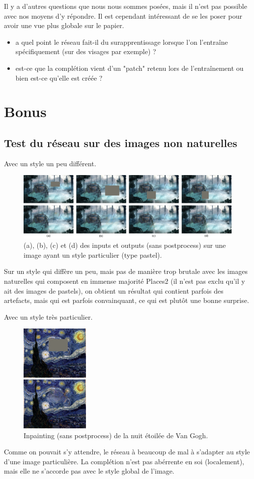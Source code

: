 \documentclass[12pt]{article}
\begin{document}
Il y a d'autres questions que nous nous sommes posées, mais il n'est pas possible avec nos moyens d'y répondre. Il est cependant intéressant de se les poser pour avoir une vue plus globale sur le papier.
\begin{itemize}
    \item a quel point le réseau fait-il du surapprentissage lorsque l'on l'entraîne spécifiquement (sur des visages par exemple) ?
    \item est-ce que la complétion vient d'un "patch" retenu lors de l'entraînement ou bien est-ce qu'elle est créée ?
\end{itemize}

\section{Bonus}

\subsection{Test du réseau sur des images non naturelles}

Avec un style un peu différent.

\begin{figure}[H]
    \includegraphics[width=1.0\textwidth]{Col.png}
    \caption{(a), (b), (c) et (d) des inputs et outputs (sans postprocess) sur une image ayant un style particulier (type pastel).}
\end{figure}

Sur un style qui diffère un peu, mais pas de manière trop brutale avec les images naturelles qui composent en immense majorité Places2 (il n'est pas exclu qu'il y ait des images de pastels), on obtient un résultat qui contient parfois des artefacts, mais qui est parfois convainquant, ce qui est plutôt une bonne surprise.

Avec un style très particulier.

\begin{figure}[H]
    \includegraphics[width=0.3\textwidth]{gogh.png}
    \caption{Inpainting (sans postprocess) de la nuit étoilée de Van Gogh.}
\end{figure}

Comme on pouvait s'y attendre, le réseau à beaucoup de mal à s'adapter au style d'une image particulière. La complétion n'est pas abérrente en soi (localement), mais elle ne s'accorde pas avec le style global de l'image.



\end{document}
